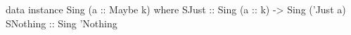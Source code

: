 \begin{code}
data instance Sing (a :: Maybe k) where
  SJust    :: Sing (a :: k) -> Sing ('Just a)
  SNothing :: Sing 'Nothing
\end{code}
